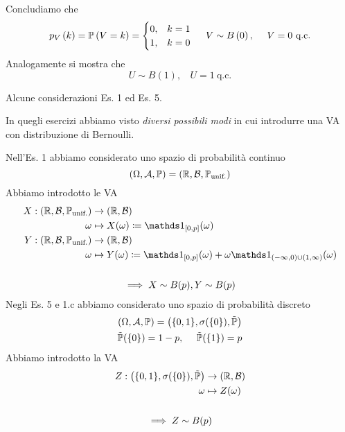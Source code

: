 \begin{enumerate}
Concludiamo che
\begin{equation*}
p_{V}\left( k\right) =\mathbb{P}\left( V=k\right) =
\begin{cases}
0, & k=1\\
1, & k=0
\end{cases}
 \ \ \ \ V\sim B\left( 0\right) ,\ \ \ \ V=0\ \text{q.c.}
\end{equation*}
Analogamente si mostra che
\begin{equation*}
U\sim B( 1) ,\ \ \ \ U=1\ \text{q.c.}
\end{equation*}
\end{enumerate}
\begin{oss}
Alcune considerazioni Es. 1 ed Es. 5.

In quegli esercizi abbiamo visto \textit{diversi possibili modi} in cui introdurre una VA con distribuzione di Bernoulli.

Nell'Es. 1 abbiamo considerato uno spazio di probabilità continuo
\begin{equation*}
( \Omega ,\mathcal{A} ,\mathbb{P}) =(\mathbb{R} ,\mathcal{B} ,\mathbb{P}_{\text{unif.}})
\end{equation*}
Abbiamo introdotto le VA
\begin{gather*}
\begin{aligned}
X:(\mathbb{R} ,\mathcal{B} ,\PP_{\text{unif.}}) & \rightarrow (\mathbb{R} ,\mathcal{B})\\
\omega  & \mapsto X( \omega ) \coloneqq \Ind_{[ 0,p]}( \omega )\\
Y:(\mathbb{R} ,\mathcal{B} ,\PP_{\text{unif.}}) & \rightarrow (\mathbb{R} ,\mathcal{B})\\
\omega  & \mapsto Y( \omega ) \coloneqq \Ind_{[ 0,p]}( \omega ) +\omega \Ind_{( -\infty ,0) \cup ( 1,\infty )}( \omega )
\end{aligned}\\
\ \\
\implies X\sim B( p) ,Y\sim B( p)
\end{gather*}
Negli Es. 5 e 1.c abbiamo considerato uno spazio di probabilità discreto
\begin{gather*}
( \Omega ,\mathcal{A} ,\mathbb{P}) =\left(\{0,1\} ,\sigma (\{0\}) ,\tilde{\mathbb{P}}\right)\\
\tilde{\mathbb{P}}(\{0\}) =1-p,\ \ \ \ \tilde{\mathbb{P}}(\{1\}) =p
\end{gather*}
Abbiamo introdotto la VA
\begin{gather*}
\begin{aligned}
Z:\left(\{0,1\} ,\sigma (\{0\}) ,\tilde{\mathbb{P}}\right) & \rightarrow (\mathbb{R} ,\mathcal{B})\\
\omega  & \mapsto Z( \omega )
\end{aligned}\\
\\
\implies Z\sim B( p)
\end{gather*}
\end{oss}

